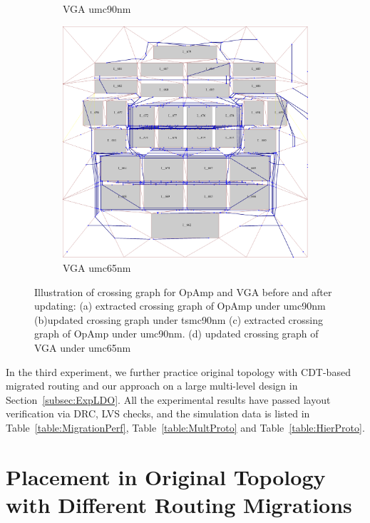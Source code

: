 \begin{figure}[ht]
\begin{subfigure}[t]{0.4\textwidth}
        \caption{VGA umc90nm}\label{fig:OrigVGA}
        \end{subfigure}
        \begin{subfigure}[t]{0.4\textwidth}
        \includegraphics[width=\textwidth]{Fig/VGAProto.eps}
        \caption{VGA umc65nm}\label{fig:VGAProto}
        \end{subfigure}
      \caption{Illustration of crossing graph for OpAmp and VGA before and after updating: (a) extracted crossing graph of OpAmp under umc90nm (b)updated crossing graph under tsmc90nm (c) extracted crossing graph of OpAmp under umc90nm. (d) updated crossing graph of VGA under umc65nm}
      \label{fig:CDTResult}
    \end{figure}

  

  In the third experiment, we further practice original topology with CDT-based migrated routing and our approach on a large multi-level design in Section~\ref{subsec:ExpLDO}. 
  All the experimental results have passed layout verification via DRC, LVS checks, and the simulation data is listed in Table~\ref{table:MigrationPerf}, Table~\ref{table:MultProto} and Table~\ref{table:HierProto}.

  \section{Placement in Original Topology with Different Routing Migrations}\label{sec:ExpMigration}


